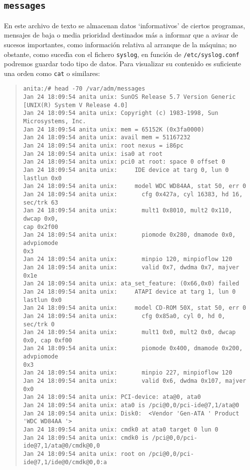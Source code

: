 \subsection{{\tt messages}}
En este archivo de texto se almacenan datos `informativos' de ciertos programas,
mensajes de baja o media prioridad destinados m\'as a informar que a avisar de
sucesos importantes, como informaci\'on relativa al arranque de la m\'aquina; 
no obstante, como suced\'{\i}a con el fichero {\tt syslog}, en funci\'on de 
{\tt /etc/syslog.conf} podremos guardar todo tipo de datos.
Para visualizar su contenido es suficiente una orden como {\tt cat} o similares:
\begin{quote}
\begin{verbatim}
anita:/# head -70 /var/adm/messages
Jan 24 18:09:54 anita unix: SunOS Release 5.7 Version Generic 
[UNIX(R) System V Release 4.0]
Jan 24 18:09:54 anita unix: Copyright (c) 1983-1998, Sun Microsystems, Inc.
Jan 24 18:09:54 anita unix: mem = 65152K (0x3fa0000)
Jan 24 18:09:54 anita unix: avail mem = 51167232
Jan 24 18:09:54 anita unix: root nexus = i86pc
Jan 24 18:09:54 anita unix: isa0 at root
Jan 24 18:09:54 anita unix: pci0 at root: space 0 offset 0
Jan 24 18:09:54 anita unix:     IDE device at targ 0, lun 0 lastlun 0x0
Jan 24 18:09:54 anita unix:     model WDC WD84AA, stat 50, err 0
Jan 24 18:09:54 anita unix:       cfg 0x427a, cyl 16383, hd 16, sec/trk 63
Jan 24 18:09:54 anita unix:       mult1 0x8010, mult2 0x110, dwcap 0x0, 
cap 0x2f00
Jan 24 18:09:54 anita unix:       piomode 0x280, dmamode 0x0, advpiomode 
0x3
Jan 24 18:09:54 anita unix:       minpio 120, minpioflow 120
Jan 24 18:09:54 anita unix:       valid 0x7, dwdma 0x7, majver 0x1e
Jan 24 18:09:54 anita unix: ata_set_feature: (0x66,0x0) failed
Jan 24 18:09:54 anita unix:     ATAPI device at targ 1, lun 0 lastlun 0x0
Jan 24 18:09:54 anita unix:     model CD-ROM 50X, stat 50, err 0
Jan 24 18:09:54 anita unix:       cfg 0x85a0, cyl 0, hd 0, sec/trk 0
Jan 24 18:09:54 anita unix:       mult1 0x0, mult2 0x0, dwcap 0x0, cap 0xf00
Jan 24 18:09:54 anita unix:       piomode 0x400, dmamode 0x200, advpiomode 
0x3
Jan 24 18:09:54 anita unix:       minpio 227, minpioflow 120
Jan 24 18:09:54 anita unix:       valid 0x6, dwdma 0x107, majver 0x0
Jan 24 18:09:54 anita unix: PCI-device: ata@0, ata0
Jan 24 18:09:54 anita unix: ata0 is /pci@0,0/pci-ide@7,1/ata@0
Jan 24 18:09:54 anita unix: Disk0:  <Vendor 'Gen-ATA ' Product 'WDC WD84AA '>
Jan 24 18:09:54 anita unix: cmdk0 at ata0 target 0 lun 0
Jan 24 18:09:54 anita unix: cmdk0 is /pci@0,0/pci-ide@7,1/ata@0/cmdk@0,0
Jan 24 18:09:54 anita unix: root on /pci@0,0/pci-ide@7,1/ide@0/cmdk@0,0:a 

\end{verbatim}
\end{quote}
